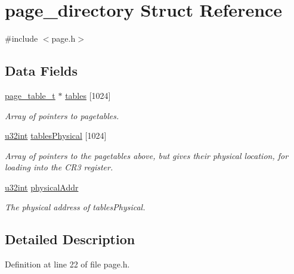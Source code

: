 \hypertarget{a00246}{}\section{page\+\_\+directory Struct Reference}
\label{a00246}


{\ttfamily \#include $<$page.\+h$>$}

\subsection*{Data Fields}
\begin{DoxyCompactItemize}
\item 
\hyperlink{a00116_a052d6ef76d4f16828bb0f478b24b6b55_a052d6ef76d4f16828bb0f478b24b6b55}{page\+\_\+table\+\_\+t} $\ast$ \hyperlink{a00246_a84d1c51d205ba38ef8356fda66065877_a84d1c51d205ba38ef8356fda66065877}{tables} \mbox{[}1024\mbox{]}
\begin{DoxyCompactList}\small\item\em Array of pointers to pagetables. \end{DoxyCompactList}\item 
\hyperlink{a00134_a7ae3a26c17ddfe117c6291739780801d_a7ae3a26c17ddfe117c6291739780801d}{u32int} \hyperlink{a00246_a99a9e823491d762288ceb3faf2b1088b_a99a9e823491d762288ceb3faf2b1088b}{tables\+Physical} \mbox{[}1024\mbox{]}
\begin{DoxyCompactList}\small\item\em Array of pointers to the pagetables above, but gives their {\itshape physical} location, for loading into the C\+R3 register. \end{DoxyCompactList}\item 
\hyperlink{a00134_a7ae3a26c17ddfe117c6291739780801d_a7ae3a26c17ddfe117c6291739780801d}{u32int} \hyperlink{a00246_a69f56a12e20a59682292842323aabefb_a69f56a12e20a59682292842323aabefb}{physical\+Addr}
\begin{DoxyCompactList}\small\item\em The physical address of tables\+Physical. \end{DoxyCompactList}\end{DoxyCompactItemize}


\subsection{Detailed Description}


Definition at line 22 of file page.\+h.



